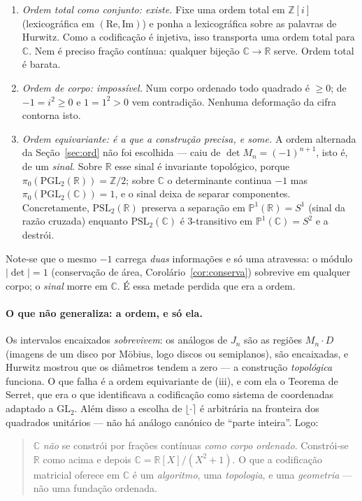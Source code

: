 \documentclass[11pt,a4paper]{article}
\theoremstyle{plain}
\theoremstyle{definition}
\theoremstyle{remark}
\newcommand{\R}{\mathbb{R}}
\newcommand{\C}{\mathbb{C}}
\newcommand{\Z}{\mathbb{Z}}
\newcommand{\Pj}{\mathbb{P}^1}
\newcommand{\GL}{\mathrm{GL}}
\newcommand{\PSL}{\mathrm{PSL}}
\begin{document}
\begin{enumerate}
\item[(i)] \emph{Ordem total como conjunto: existe.} Fixe uma ordem total em $\Z[i]$ (lexicográfica
em $(\mathrm{Re},\mathrm{Im})$) e ponha a lexicográfica sobre as palavras de Hurwitz. Como a
codificação é injetiva, isso transporta uma ordem total para $\C$. Nem é preciso fração contínua:
qualquer bijeção $\C\to\R$ serve. Ordem total é barata.

\item[(ii)] \emph{Ordem de corpo: impossível.} Num corpo ordenado todo quadrado é $\geq0$; de
$-1 = i^2 \geq 0$ e $1 = 1^2 > 0$ vem contradição. Nenhuma deformação da cifra contorna isto.

\item[(iii)] \emph{Ordem equivariante: é a que a construção precisa, e some.} A ordem alternada da
Seção~\ref{sec:ord} não foi escolhida --- caiu de $\det M_n = (-1)^{n+1}$, isto é, de um \emph{sinal}. Sobre
$\R$ esse sinal é invariante topológico, porque $\pi_0(\mathrm{PGL}_2(\R)) = \Z/2$; sobre $\C$ o
determinante continua $-1$ mas $\pi_0(\mathrm{PGL}_2(\C)) = 1$, e o sinal deixa de separar
componentes. Concretamente, $\PSL_2(\R)$ preserva a separação em $\Pj(\R)=S^1$ (sinal da razão
cruzada) enquanto $\PSL_2(\C)$ é $3$-transitivo em $\Pj(\C)=S^2$ e a destrói.
\end{enumerate}

\noindent Note-se que o mesmo $-1$ carrega \emph{duas} informações e só uma atravessa: o módulo
$|\det|=1$ (conservação de área, Corolário~\ref{cor:conserva}) sobrevive em qualquer corpo; o
\emph{sinal} morre em $\C$. É essa metade perdida que era a ordem.

\paragraph{O que não generaliza: a ordem, e só ela.} Os intervalos encaixados \emph{sobrevivem}:
os análogos de $J_n$ são as regiões $M_n\cdot D$ (imagens de um disco por Möbius, logo discos ou
semiplanos), são encaixadas, e Hurwitz mostrou que os diâmetros tendem a zero --- a construção
\emph{topológica} funciona. O que falha é a ordem equivariante de (iii), e com ela o Teorema de
Serret, que era o que identificava a codificação como sistema de coordenadas adaptado a $\GL_2$.
Além disso a escolha de $\lfloor\cdot\rceil$ é arbitrária na fronteira dos quadrados unitários ---
não há análogo canónico de ``parte inteira''. Logo:
\begin{quote}
$\C$ \emph{não} se constrói por frações contínuas \emph{como corpo ordenado}. Constrói-se $\R$ como
acima e depois $\C = \R[X]/(X^2+1)$. O que a codificação matricial oferece em $\C$ é um
\emph{algoritmo}, uma \emph{topologia}, e uma \emph{geometria} --- não uma fundação ordenada.
\end{quote}
\end{document}
